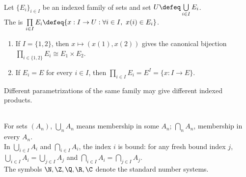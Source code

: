 \begin{definition} \label{def:indexed-cartesian-product} \\
Let $\{E_i\}_{i\in I}$ be an indexed family of sets and set $U\defeq\bigcup\limits_{i\in I}E_i$.\\
The  is $\prod\limits_{i\in I}E_i\defeq\{x:I\to U:\forall i\in I,\ x(i)\in E_i\}$.
\begin{enumerate}[label=(\roman*)]
\setlength{\itemsep}{0pt}
\item If $I=\{1,2\}$, then $x\mapsto(x(1),x(2))$ gives the canonical bijection $\prod\limits_{i\in\{1,2\}}E_i\cong E_1\times E_2$.
\item If $E_i=E$ for every $i\in I$, then $\prod\limits_{i\in I}E_i=E^I=\{x:I\to E\}$.
\end{enumerate}
Different parametrizations of the same family may give different indexed products.
\end{definition}

\begin{remark} \label{rem:index-variables-and-number-system-placement} \\
For sets $(A_n)$, $\bigcup_nA_n$ means membership in some $A_n$; $\bigcap_nA_n$, membership in every $A_n$.\\
In $\bigcup\limits_{i\in I}A_i$ and $\bigcap\limits_{i\in I}A_i$, the index $i$ is bound: for any fresh bound index $j$, $\bigcup\limits_{i\in I}A_i=\bigcup\limits_{j\in I}A_j$ and $\bigcap\limits_{i\in I}A_i=\bigcap\limits_{j\in I}A_j$.\\
The symbols $\N,\Z,\Q,\R,\C$ denote the standard number systems.
\end{remark}
